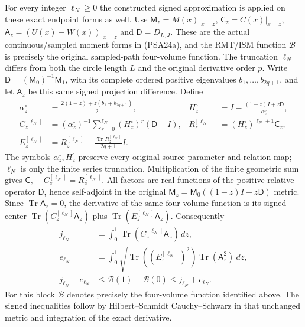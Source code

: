 For every integer $\ell_N\ge0$ the constructed signed approximation
is applied on these exact endpoint forms as well. Use $\mathsf M_z=M(x)|_{x=z}$,
$\mathsf C_z=C(x)|_{x=z}$,
$\mathsf A_z=(U(x)-W(x))|_{x=z}$ and
$\mathsf D=D_{L,J}$. These are the actual continuous/sampled
moment forms in (PSA24a), and the RMT/ISM function $\mathcal B$
is precisely the original sampled-path four-volume function.
The truncation $\ell_N$ differs from both the circle length $L$
and the original derivative order $p$.
Write $\mathsf D=(\mathsf M_0)^{-1}\mathsf M_1$, with its complete
ordered positive eigenvalues $b_1,\ldots,b_{2q+1}$, and let
$\mathsf A_z$ be this same signed projection difference. Define
\[
 \begin{aligned}
 \alpha_z^\circ&=\frac{2(1-z)+z(b_1+b_{2q+1})}{2},&
 H_z^\circ&=I-\frac{(1-z)I+z\mathsf D}{\alpha_z^\circ},\\
 C_z^{[\ell_N]}&=(\alpha_z^\circ)^{-1}
       \sum_{r=0}^{\ell_N}(H_z^\circ)^r(\mathsf D-I),&
 R_z^{[\ell_N]}&=(H_z^\circ)^{\ell_N+1}\mathsf C_z,\\
 E_z^{[\ell_N]}&=R_z^{[\ell_N]}
          -\frac{\operatorname{Tr}R_z^{[\ell_N]}}{2q+1}I .
 \end{aligned}
 \tag{PSA25ba}
\]
The symbols $\alpha_z^\circ,H_z^\circ$ preserve every original
source parameter and relation map; $\ell_N$ is only the finite
series truncation. Multiplication of the finite geometric sum
gives $\mathsf C_z-C_z^{[\ell_N]}=R_z^{[\ell_N]}$.
All factors are real functions of the positive relative
operator $\mathsf D$, hence self-adjoint in the original
$\mathsf M_z=\mathsf M_0((1-z)I+z\mathsf D)$ metric.
Since $\operatorname{Tr}\mathsf A_z=0$, the derivative of the same
four-volume function is its signed center
$\operatorname{Tr}(C_z^{[\ell_N]}\mathsf A_z)$ plus
$\operatorname{Tr}(E_z^{[\ell_N]}\mathsf A_z)$.
Consequently
\[
 \begin{aligned}
 j_{\ell_N}&=\int_0^1
       \operatorname{Tr}(C_z^{[\ell_N]}\mathsf A_z)\,dz,\\
 e_{\ell_N}&=\int_0^1
       \sqrt{\operatorname{Tr}((E_z^{[\ell_N]})^2)
                     \operatorname{Tr}(\mathsf A_z^2)}\,dz,\\
 j_{\ell_N}-e_{\ell_N}
 &\le\mathcal B(1)-\mathcal B(0)\le j_{\ell_N}+e_{\ell_N}.
 \end{aligned}
 \tag{PSA25bb}
\]
For this block $\mathcal B$ denotes precisely the four-volume
function identified above. The signed inequalities follow by
Hilbert--Schmidt Cauchy--Schwarz in that unchanged metric and
integration of the exact derivative.
